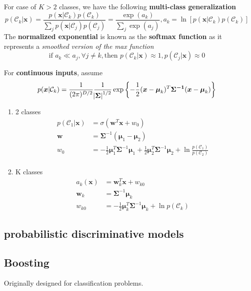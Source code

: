 \documentclass[11pt]{article}
\newcommand{\bl}[1] {\boldsymbol{#1}}
\begin{document}
For case of \(K > 2\) classes, we have the following \textbf{multi-class generalization}
\begin{equation*}
p(\mathcal{C}_k|\bl{x})=\frac{p(\bl{x}|\mathcal{C}_k)p(\mathcal{C}_k)}
{\sum_jp(\bl{x}|\mathcal{C}_j)p(\mathcal{C}_j)}=\frac{\exp(a_k)}{\sum_j\exp(a_j)},
a_k=\ln\left[p(\bl{x}|\mathcal{C}_k)p(\mathcal{C}_k)\right]
\end{equation*}
The \textbf{normalized exponential} is known as the \textbf{softmax function} as it represents
a \emph{smoothed version of the max function}
\begin{equation*}
\text{if } a_k\ll a_j,\forall j\neq k,\text{then } p(\mathcal{C}_k|\bl{x})\approx 1,
p(\mathcal{C}_j|\bl{x})\approx 0
\end{equation*}

For \textbf{continuous inputs}, assume
\begin{equation*}
p(\bl{x}|\mathcal{C}_k)=\frac{1}{(2\pi)^{D/2}}\frac{1}
{\abs{\bl{\Sigma}}^{1/2}}\exp\left\{-\frac{1}{2}(\bl{x}-\bl{\mu}_k)^T
\bl{\Sigma^{-1}}(\bl{x}-\bl{\mu}_k)\right\}
\end{equation*}
\begin{enumerate}
\item 2 classes
\begin{align*}
p(\mathcal{C}_1|\bl{x})&=\sigma(\bl{w}^T\bl{x}+w_0)\\
\bl{w}&=\bl{\Sigma}^{-1}(\bl{\mu}_1-\bl{\mu}_2)\\
w_0&=-\frac{1}{2}\bl{\mu}_1^T\bl{\Sigma}^{-1}\bl{\mu}_1+
\frac{1}{2}\bl{\mu}_2^T\bl{\Sigma}^{-1}\bl{\mu}_2+\ln\frac{p(\mathcal{C}_1)}
{p(\mathcal{C}_2)}\\
\end{align*}
\item K classes
\begin{align*}
a_k(\bl{x})&=\bl{w}_k^T\bl{x}+w_{k0}\\
\bl{w}_k&=\bl{\Sigma}^{-1}\bl{\mu}_k\\
w_{k0}&=-\frac{1}{2}\bl{\mu}_k^T\bl{\Sigma}^{-1}\bl{\mu}_k+\ln p(\mathcal{C}_k)
\end{align*}
\end{enumerate}
\subsection{probabilistic discriminative models}
\label{sec:org24cf01a}
\subsection{Boosting}
\label{sec:org81a853a}
Originally designed for classification problems.
\end{document}
